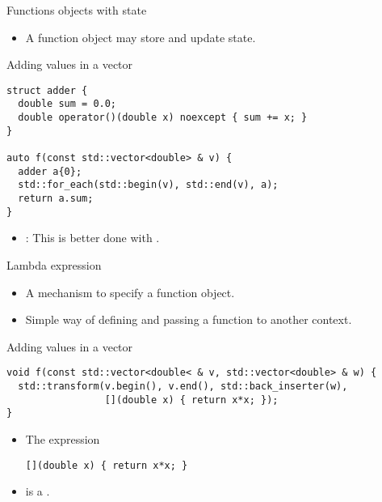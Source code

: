 \begin{frame}[t,fragile]{Functions objects with state}
\begin{itemize}
  \item A function object may store and update state.
\end{itemize}
\begin{block}{Adding values in a vector}
\begin{lstlisting}
struct adder {
  double sum = 0.0;
  double operator()(double x) noexcept { sum += x; }
}

auto f(const std::vector<double> & v) {
  adder a{0};
  std::for_each(std::begin(v), std::end(v), a); 
  return a.sum;
}
\end{lstlisting}
\end{block}
\begin{itemize}
  \item {}: This is better done with .
\end{itemize}
\end{frame}


\begin{frame}[t,fragile]{Lambda expression}
\begin{itemize}
  \item A mechanism to specify a function object.
  \item Simple way of defining and passing a function to another context.
\end{itemize}

\begin{block}{Adding values in a vector}
\begin{lstlisting}
void f(const std::vector<double< & v, std::vector<double> & w) {
  std::transform(v.begin(), v.end(), std::back_inserter(w),
                 [](double x) { return x*x; });
}
\end{lstlisting}
\end{block}
\begin{itemize}
  \item The expression
\begin{lstlisting}
[](double x) { return x*x; }
\end{lstlisting}
  \item is a .
\end{itemize}
\end{frame}

